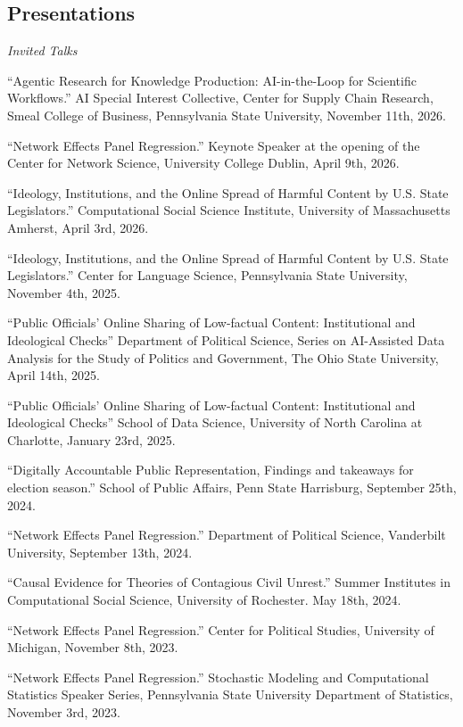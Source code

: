 \documentclass[overlapped,line]{res}
\begin{document}
\begin{resume}
\section{\bf Presentations}
\vspace{.1cm}
\hspace{-1cm} \emph{Invited Talks}
\begin{etaremune}
\item ``Agentic Research for Knowledge Production: AI-in-the-Loop for Scientific Workflows.'' AI Special Interest Collective, Center for Supply Chain Research, Smeal College of Business, Pennsylvania State University, November 11th, 2026.
\item ``Network Effects Panel Regression.'' Keynote Speaker at the opening of the Center for Network Science, University College Dublin, April 9th, 2026.
\item ``Ideology, Institutions, and the Online Spread of Harmful Content by U.S. State Legislators.'' Computational Social Science Institute, University of Massachusetts Amherst, April 3rd, 2026.
\item ``Ideology, Institutions, and the Online Spread of Harmful Content by U.S. State Legislators.'' Center for Language Science, Pennsylvania State University, November 4th, 2025.
\item ``Public Officials' Online Sharing of Low-factual Content: Institutional and Ideological Checks'' Department of Political Science, Series on AI-Assisted Data Analysis for the Study of Politics and Government, The Ohio State University, April 14th, 2025. 
\item ``Public Officials' Online Sharing of Low-factual Content: Institutional and Ideological Checks'' School of Data Science, University of North Carolina at Charlotte, January 23rd, 2025. 
\item ``Digitally Accountable Public Representation, Findings and takeaways for election season.'' School of Public Affairs, Penn State Harrisburg, September 25th, 2024. 
\item ``Network Effects Panel Regression.'' Department of Political Science, Vanderbilt University, September 13th, 2024.
\item ``Causal Evidence for Theories of Contagious Civil Unrest.'' Summer Institutes in Computational Social Science, University of Rochester. May 18th, 2024. 
\item ``Network Effects Panel Regression.'' Center for Political Studies, University of Michigan, November 8th, 2023.
\item ``Network Effects Panel Regression.'' Stochastic Modeling and Computational Statistics Speaker Series, Pennsylvania State University Department of Statistics, November 3rd, 2023.

\end{etaremune}
\end{resume}
\end{document}
